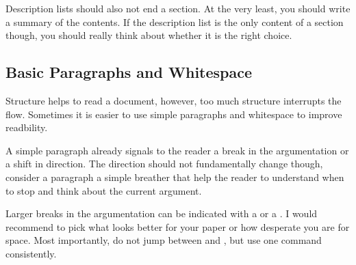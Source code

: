 Description lists should also not end a section.
At the very least, you should write a summary of the contents.
If the description list is the only content of a section though, you should really think about whether it is the right choice.


\subsection{Basic Paragraphs and Whitespace}

Structure helps to read a document, however, too much structure interrupts the flow.
Sometimes it is easier to use simple paragraphs and whitespace to improve readbility.

A simple paragraph already signals to the reader a break in the argumentation or a shift in direction.
The direction should not fundamentally change though, consider a paragraph a simple breather that help the reader to understand when to stop and think about the current argument.

\medskip
Larger breaks in the argumentation can be indicated with a  or a .
I would recommend to pick what looks better for your paper or how desperate you are for space.
Most importantly, do not jump between  and , but use one command consistently.

